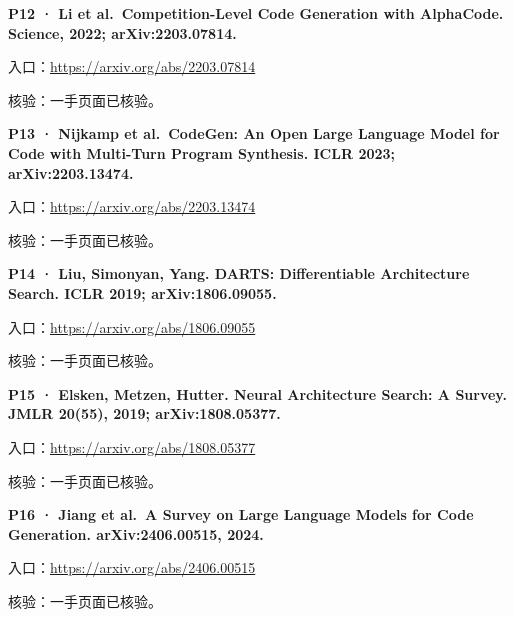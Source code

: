 \par\noindent\begin{minipage}{\linewidth}
\textbf{P12 · Li et al.~Competition-Level Code Generation with
AlphaCode. Science, 2022; arXiv:\allowbreak{}2203.07814.}

入口：\url{https://arxiv.org/abs/2203.07814}

核验：一手页面已核验。
\end{minipage}\par\vspace{6pt}

\par\noindent\begin{minipage}{\linewidth}
\textbf{P13 · Nijkamp et al.~CodeGen: An Open Large Language Model for
Code with Multi-Turn Program Synthesis. ICLR 2023; arXiv:\allowbreak{}2203.13474.}

入口：\url{https://arxiv.org/abs/2203.13474}

核验：一手页面已核验。
\end{minipage}\par\vspace{6pt}

\par\noindent\begin{minipage}{\linewidth}
\textbf{P14 · Liu, Simonyan, Yang. DARTS: Differentiable Architecture
Search. ICLR 2019; arXiv:\allowbreak{}1806.09055.}

入口：\url{https://arxiv.org/abs/1806.09055}

核验：一手页面已核验。
\end{minipage}\par\vspace{6pt}

\par\noindent\begin{minipage}{\linewidth}
\textbf{P15 · Elsken, Metzen, Hutter. Neural Architecture Search: A
Survey. JMLR 20(55), 2019; arXiv:\allowbreak{}1808.05377.}

入口：\url{https://arxiv.org/abs/1808.05377}

核验：一手页面已核验。
\end{minipage}\par\vspace{6pt}

\par\noindent\begin{minipage}{\linewidth}
\textbf{P16 · Jiang et al.~A Survey on Large Language Models for Code
Generation. arXiv:\allowbreak{}2406.00515, 2024.}

入口：\url{https://arxiv.org/abs/2406.00515}

核验：一手页面已核验。
\end{minipage}\par\vspace{6pt}

